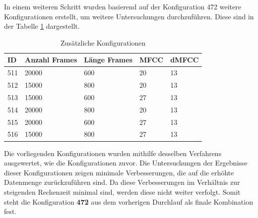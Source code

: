 In einem weiteren Schritt wurden basierend auf der Konfiguration 472 weitere Konfigurationen erstellt, um weitere Untersuchungen durchzuführen.
Diese sind in der Tabelle \ref{table:additionalKonfigs} dargestellt.
\begin{table}[H]
    \centering
    \begin{tabular}{l|l|l|l|l}
    ID  & Anzahl Frames & Länge Frames & \ac{MFCC} & \ac{dMFCC} \\ \hline
    511 & 20000         & 600          & 20        & 13     \\ \hline
    512 & 15000         & 800          & 20        & 13     \\ \hline
    513 & 15000         & 600          & 27        & 13     \\ \hline
    514 & 20000         & 800          & 20        & 13     \\ \hline
    515 & 20000         & 600          & 27        & 13     \\ \hline
    516 & 15000         & 800          & 27        & 13    
    \end{tabular}
    \caption{Zusätzliche Konfigurationen}
    \label{table:additionalKonfigs}
\end{table}\noindent
Die vorliegenden Konfigurationen wurden mithilfe desselben Verfahrens ausgewertet, wie die Konfigurationen zuvor.
Die Untersuchungen der Ergebnisse dieser Konfigurationen zeigen minimale Verbesserungen, die auf die erhöhte Datenmenge zurückzuführen sind.
Da diese Verbesserungen im Verhältnis zur steigenden Rechenzeit minimal sind, werden diese nicht weiter verfolgt.
Somit steht die Konfiguration \textbf{472} aus dem vorherigen Durchlauf als finale Kombination fest.

